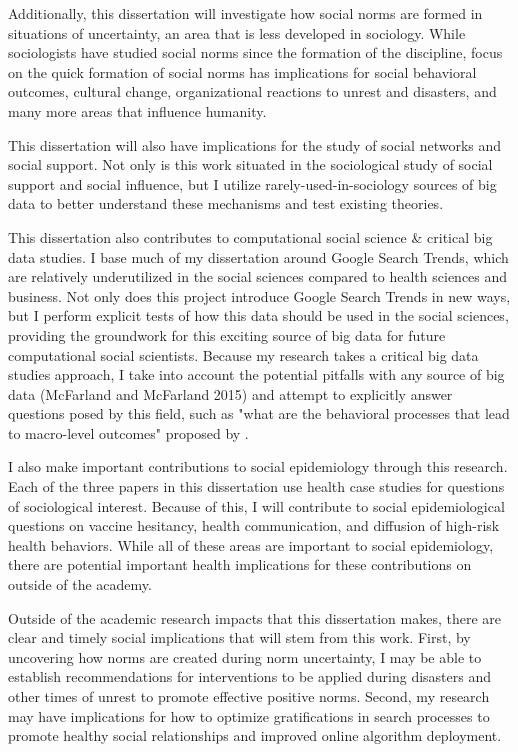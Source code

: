 Additionally, this dissertation will investigate how social norms are
formed in situations of uncertainty, an area that is less developed in
sociology. While sociologists have studied social norms since the
formation of the discipline, focus on the quick formation of social
norms has implications for social behavioral outcomes, cultural change,
organizational reactions to unrest and disasters, and many more areas
that influence humanity.

This dissertation will also have implications for the study of social
networks and social support. Not only is this work situated in the
sociological study of social support and social influence, but I utilize
rarely-used-in-sociology sources of big data to better understand these
mechanisms and test existing theories.

This dissertation also contributes to computational social science \&
critical big data studies. I base much of my dissertation around Google
Search Trends, which are relatively underutilized in the social sciences
compared to health sciences and business. Not only does this project
introduce Google Search Trends in new ways, but I perform explicit tests
of how this data should be used in the social sciences, providing the
groundwork for this exciting source of big data for future computational
social scientists. Because my research takes a critical big data studies
approach, I take into account the potential pitfalls with any source of
big data (McFarland and McFarland 2015) and attempt to explicitly answer
questions posed by this field, such as "what are the behavioral
processes that lead to macro-level outcomes" proposed by \citet{breigerScaling2015}.

I also make important contributions to social epidemiology through this
research. Each of the three papers in this dissertation use health case
studies for questions of sociological interest. Because of this, I will
contribute to social epidemiological questions on vaccine hesitancy,
health communication, and diffusion of high-risk health behaviors. While
all of these areas are important to social epidemiology, there are
potential important health implications for these contributions on
outside of the academy.

Outside of the academic research impacts that this dissertation makes,
there are clear and timely social implications that will stem from this
work. First, by uncovering how norms are created during norm
uncertainty, I may be able to establish recommendations for
interventions to be applied during disasters and other times of unrest
to promote effective positive norms. Second, my research may have
implications for how to optimize gratifications in search processes to
promote healthy social relationships and improved online algorithm
deployment.

